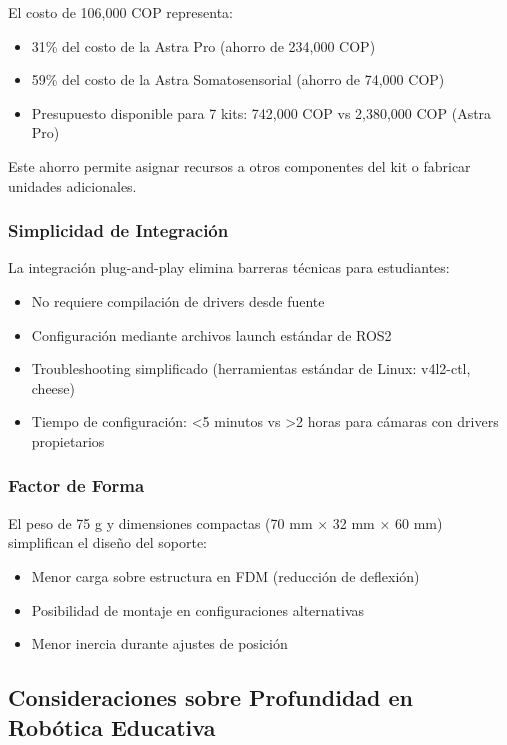 El costo de 106,000 COP representa:
\begin{itemize}
    \item 31\% del costo de la Astra Pro (ahorro de 234,000 COP)
    \item 59\% del costo de la Astra Somatosensorial (ahorro de 74,000 COP)
    \item Presupuesto disponible para 7 kits: 742,000 COP vs 2,380,000 COP (Astra Pro)
\end{itemize}

Este ahorro permite asignar recursos a otros componentes del kit o fabricar unidades adicionales.

\subsubsection{Simplicidad de Integración}

La integración plug-and-play elimina barreras técnicas para estudiantes:
\begin{itemize}
    \item No requiere compilación de drivers desde fuente
    \item Configuración mediante archivos launch estándar de ROS2
    \item Troubleshooting simplificado (herramientas estándar de Linux: v4l2-ctl, cheese)
    \item Tiempo de configuración: <5 minutos vs >2 horas para cámaras con drivers propietarios
\end{itemize}

\subsubsection{Factor de Forma}

El peso de 75 g y dimensiones compactas (70 mm × 32 mm × 60 mm) simplifican el diseño del soporte:
\begin{itemize}
    \item Menor carga sobre estructura en FDM (reducción de deflexión)
    \item Posibilidad de montaje en configuraciones alternativas
    \item Menor inercia durante ajustes de posición
\end{itemize}

\subsection{Consideraciones sobre Profundidad en Robótica Educativa}

